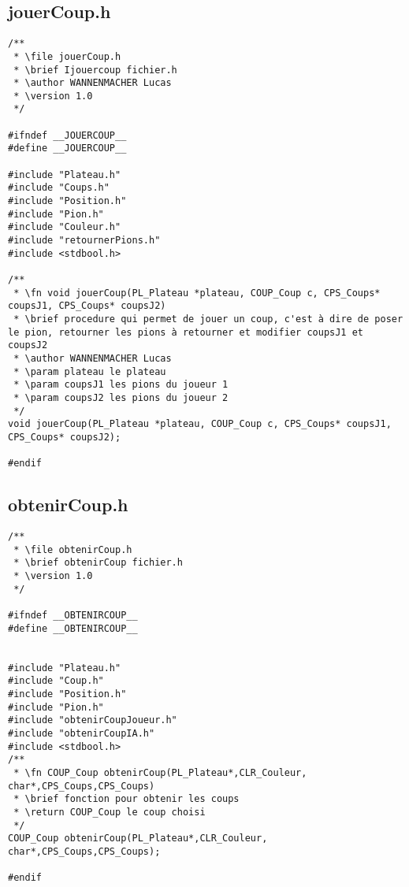 \subsection{jouerCoup.h}
\begin{lstlisting}
/**
 * \file jouerCoup.h
 * \brief Ijouercoup fichier.h
 * \author WANNENMACHER Lucas
 * \version 1.0
 */

#ifndef __JOUERCOUP__
#define __JOUERCOUP__

#include "Plateau.h"
#include "Coups.h"
#include "Position.h"
#include "Pion.h"
#include "Couleur.h"
#include "retournerPions.h"
#include <stdbool.h>

/**
 * \fn void jouerCoup(PL_Plateau *plateau, COUP_Coup c, CPS_Coups* coupsJ1, CPS_Coups* coupsJ2)
 * \brief procedure qui permet de jouer un coup, c'est à dire de poser le pion, retourner les pions à retourner et modifier coupsJ1 et coupsJ2
 * \author WANNENMACHER Lucas
 * \param plateau le plateau
 * \param coupsJ1 les pions du joueur 1
 * \param coupsJ2 les pions du joueur 2
 */
void jouerCoup(PL_Plateau *plateau, COUP_Coup c, CPS_Coups* coupsJ1, CPS_Coups* coupsJ2);

#endif  
\end{lstlisting}

\subsection{obtenirCoup.h}
\begin{lstlisting}
/**
 * \file obtenirCoup.h
 * \brief obtenirCoup fichier.h
 * \version 1.0
 */

#ifndef __OBTENIRCOUP__
#define __OBTENIRCOUP__


#include "Plateau.h"
#include "Coup.h"
#include "Position.h"
#include "Pion.h"
#include "obtenirCoupJoueur.h"
#include "obtenirCoupIA.h"
#include <stdbool.h>
/**
 * \fn COUP_Coup obtenirCoup(PL_Plateau*,CLR_Couleur, char*,CPS_Coups,CPS_Coups)
 * \brief fonction pour obtenir les coups
 * \return COUP_Coup le coup choisi
 */
COUP_Coup obtenirCoup(PL_Plateau*,CLR_Couleur, char*,CPS_Coups,CPS_Coups);

#endif
\end{lstlisting}

